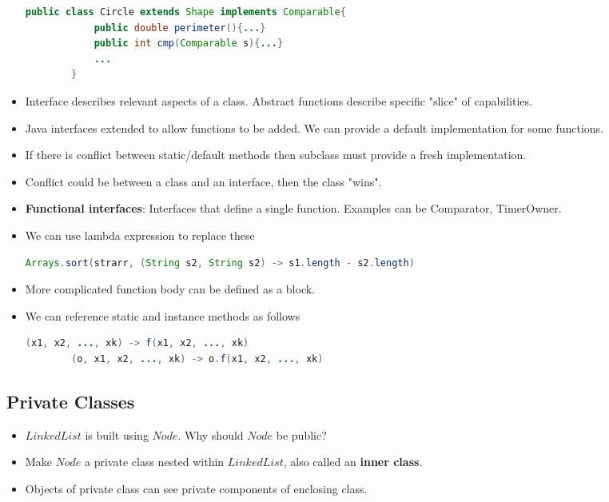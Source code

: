 \documentclass[a4paper]{article}
\begin{document}
\begin{itemize}
\begin{lstlisting}[language=Java]
        public class Circle extends Shape implements Comparable{
            public double perimeter(){...}
            public int cmp(Comparable s){...}
            ...
        }
    \end{lstlisting}
    \item Interface describes relevant aspects of a class. Abstract functions describe specific "slice" of capabilities.
    \item Java interfaces extended to allow functions to be added. We can provide a default implementation for some functions.
    \item If there is conflict between static/default methods then subclass must provide a fresh implementation.
    \item Conflict could be between a class and an interface, then the class "wins".
    \item \textbf{Functional interfaces}: Interfaces that define a single function. Examples can be Comparator, TimerOwner.
    \item We can use lambda expression to replace these
    \begin{lstlisting}[language=Java]
        Arrays.sort(strarr, (String s2, String s2) -> s1.length - s2.length)
    \end{lstlisting}
    \item More complicated function body can be defined as a block.
    \item We can reference static and instance methods as follows
    \begin{lstlisting}[language=Java]
        (x1, x2, ..., xk) -> f(x1, x2, ..., xk)
        (o, x1, x2, ..., xk) -> o.f(x1, x2, ..., xk)
    \end{lstlisting}
\end{itemize}

\subsection{Private Classes}
\begin{itemize}
    \item $LinkedList$ is built using $Node$. Why should $Node$ be public?
    \item Make $Node$ a private class nested within $LinkedList$, also called an \textbf{inner class}.
    \item Objects of private class can see private components of enclosing class.
\end{itemize}
\end{document}
